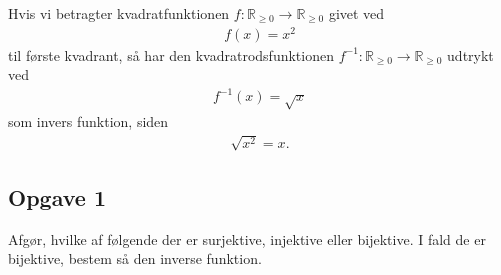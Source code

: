 \begin{exa}
Hvis vi betragter kvadratfunktionen $f: \mathbb{R}_{\geq 0} \to \mathbb{R}_{\geq 0}$ givet ved
\begin{align*}
	f(x) = x^2
\end{align*}
til første kvadrant, så har den kvadratrodsfunktionen $f^{-1}: \mathbb{R}_{\geq 0} \to \mathbb{R}_{\geq 0}$ udtrykt ved
\begin{align*}
	f^{-1}(x) = \sqrt{x}
\end{align*}
som invers funktion, siden
\begin{align*}
	\sqrt{x^2} = x.
\end{align*}
\end{exa}

\subsection*{Opgave 1}
Afgør, hvilke af følgende der er surjektive, injektive eller bijektive. I fald de er bijektive, bestem så den inverse funktion. 
